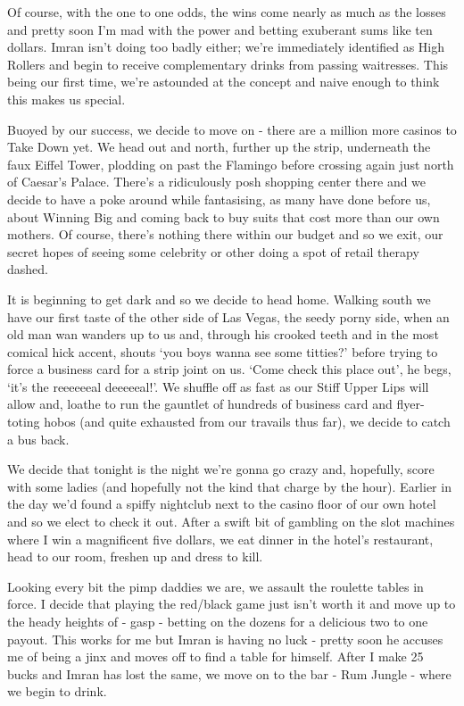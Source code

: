 \documentclass[a5paper,titlepage,draft]{book}
\begin{document}
Of course, with the one to one odds, the wins come nearly as much as the losses and pretty soon I'm mad with the power and betting exuberant sums like ten dollars.  Imran isn't doing too badly either; we're immediately identified as High Rollers and begin to receive complementary drinks from passing waitresses.  This being our first time, we're astounded at the concept and naive enough to think this makes us special.

Buoyed by our success, we decide to move on - there are a million more casinos to Take Down yet.  We head out and north, further up the strip, underneath the faux Eiffel Tower, plodding on past the Flamingo before crossing again just north of Caesar's Palace.  There's a ridiculously posh shopping center there and we decide to have a poke around while fantasising, as many have done before us, about Winning Big and coming back to buy suits that cost more than our own mothers.  Of course, there's nothing there within our budget and so we exit, our secret hopes of seeing some celebrity or other doing a spot of retail therapy dashed.

It is beginning to get dark and so we decide to head home.  Walking south we have our first taste of the other side of Las Vegas, the seedy porny side, when an old man wan wanders up to us and, through his crooked teeth and in the most comical hick accent, shouts `you boys wanna see some titties?' before trying to force a business card for a strip joint on us. `Come check this place out', he begs, `it's the reeeeeeal deeeeeal!'.  We shuffle off as fast as our Stiff Upper Lips will allow and, loathe to run the gauntlet of hundreds of business card and flyer-toting hobos (and quite exhausted from our travails thus far), we decide to catch a bus back.

We decide that tonight is the night we're gonna go crazy and, hopefully, score with some ladies (and hopefully not the kind that charge by the hour).  Earlier in the day we'd found a spiffy nightclub next to the casino floor of our own hotel and so we elect to check it out.  After a swift bit of gambling on the slot machines where I win a magnificent five dollars, we eat dinner in the hotel's restaurant, head to our room, freshen up and dress to kill.

Looking every bit the pimp daddies we are, we assault the roulette tables in force.  I decide that playing the red/black game just isn't worth it and move up to the heady heights of - gasp - betting on the dozens for a delicious two to one payout.  This works for me but Imran is having no luck - pretty soon he accuses me of being a jinx and moves off to find a table for himself.  After I make 25 bucks and Imran has lost the same, we move on to the bar - Rum Jungle - where we begin to drink.
\end{document}
